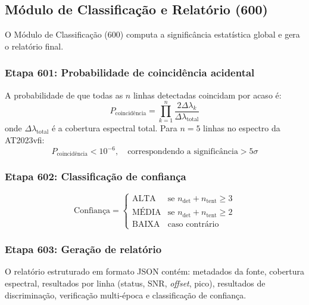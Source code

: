 \documentclass[12pt,a4paper]{article}
\begin{document}
\subsection{Módulo de Classificação e Relatório (600)}

O Módulo de Classificação (600) computa a significância
estatística global e gera o relatório final.

\subsubsection{Etapa 601: Probabilidade de coincidência acidental}

A probabilidade de que todas as $n$ linhas detectadas coincidam
por acaso é:
\begin{equation}
P_{\text{coincidência}} = \prod_{k=1}^{n}
  \frac{2 \Delta\lambda_k}{\Delta\lambda_{\text{total}}}
\label{eq:probabilidade}
\end{equation}
onde $\Delta\lambda_{\text{total}}$ é a cobertura espectral total.
Para $n = 5$ linhas no espectro da AT2023vfi:
\begin{equation}
P_{\text{coincidência}} < 10^{-6},
\quad \text{correspondendo a significância} > 5\sigma
\label{eq:significancia}
\end{equation}

\subsubsection{Etapa 602: Classificação de confiança}

\begin{equation}
\text{Confiança} = \begin{cases}
\text{ALTA} & \text{se } n_{\text{det}} + n_{\text{tent}} \geq 3 \\
\text{MÉDIA} & \text{se } n_{\text{det}} + n_{\text{tent}} \geq 2 \\
\text{BAIXA} & \text{caso contrário}
\end{cases}
\label{eq:confianca}
\end{equation}

\subsubsection{Etapa 603: Geração de relatório}

O relatório estruturado em formato JSON contém: metadados da
fonte, cobertura espectral, resultados por linha (status, SNR,
\textit{offset}, pico), resultados de discriminação, verificação
multi-época e classificação de confiança.
\end{document}
